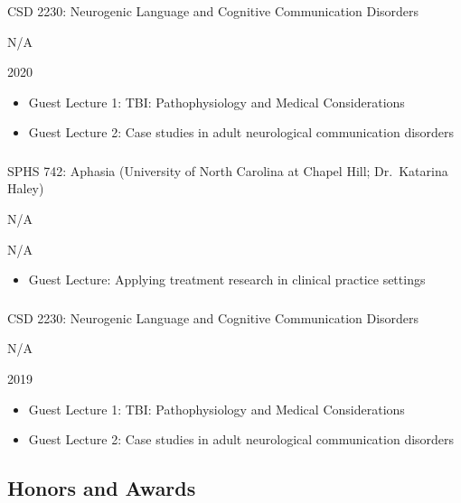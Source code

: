 \documentclass[
]{article}
\providecommand{\tightlist}{%
  \setlength{\itemsep}{0pt}\setlength{\parskip}{0pt}}
\begin{document}
CSD 2230: Neurogenic Language and Cognitive Communication Disorders

N/A

2020

\begin{itemize}
\tightlist
\item
  Guest Lecture 1: TBI: Pathophysiology and Medical Considerations
\item
  Guest Lecture 2: Case studies in adult neurological communication
  disorders
\end{itemize}

\hypertarget{section-28}{%
\subsubsection{}\label{section-28}}

SPHS 742: Aphasia (University of North Carolina at Chapel Hill;
Dr.~Katarina Haley)

N/A

N/A

\begin{itemize}
\tightlist
\item
  Guest Lecture: Applying treatment research in clinical practice
  settings
\end{itemize}

\hypertarget{section-29}{%
\subsubsection{}\label{section-29}}

CSD 2230: Neurogenic Language and Cognitive Communication Disorders

N/A

2019

\begin{itemize}
\tightlist
\item
  Guest Lecture 1: TBI: Pathophysiology and Medical Considerations
\item
  Guest Lecture 2: Case studies in adult neurological communication
  disorders
\end{itemize}

\hypertarget{honors-and-awards}{%
\subsection{Honors and Awards}\label{honors-and-awards}}

\hypertarget{section-30}{%
\subsubsection{}\label{section-30}}
\end{document}
